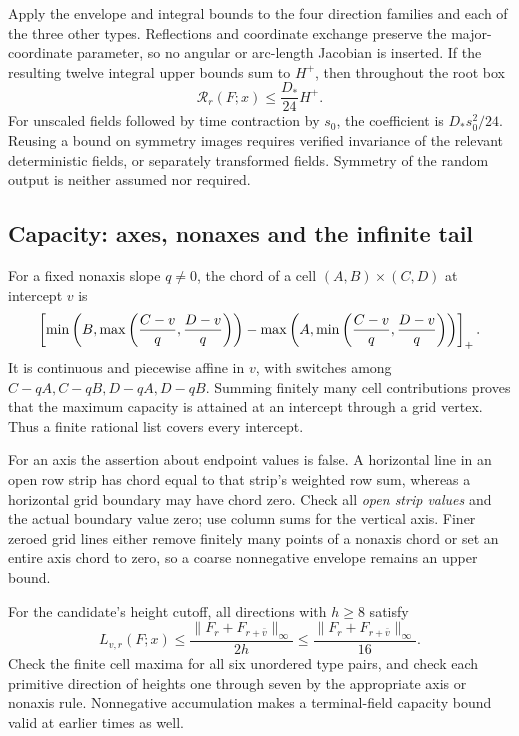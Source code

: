 Apply the envelope and integral bounds to the four direction families
and each of the three other types. Reflections and coordinate exchange
preserve the major-coordinate parameter, so no angular or arc-length
Jacobian is inserted. If the resulting twelve integral upper bounds
sum to \(H^+\), then throughout the root box
\begin{equation}\label{eq:certRisk}
 \mathcal R_r(F;x)\le\frac{D_*}{24}H^+.
\end{equation}
For unscaled fields followed by time contraction by \(s_0\), the
coefficient is \(D_*s_0^2/24\). Reusing a bound on symmetry images
requires verified invariance of the relevant deterministic fields,
or separately transformed fields. Symmetry of the random output is
neither assumed nor required.

\subsection{Capacity: axes, nonaxes and the infinite tail}
For a fixed nonaxis slope \(q\ne0\), the chord of a cell
\((A,B)\times(C,D)\) at intercept \(v\) is
\[
 \left[\min\left(B,\max\left(\frac{C-v}{q},\frac{D-v}{q}\right)\right)
 -\max\left(A,\min\left(\frac{C-v}{q},\frac{D-v}{q}\right)\right)\right]_+.
\]
It is continuous and piecewise affine in \(v\), with switches among
\(C-qA,C-qB,D-qA,D-qB\). Summing finitely many cell contributions
proves that the maximum capacity is attained at an intercept through
a grid vertex. Thus a finite rational list covers every intercept.

For an axis the assertion about endpoint values is false. A horizontal
line in an open row strip has chord equal to that strip's weighted
row sum, whereas a horizontal grid boundary may have chord zero.
Check all \emph{open strip values} and the actual boundary value zero;
use column sums for the vertical axis. Finer zeroed grid lines either
remove finitely many points of a nonaxis chord or set an entire axis
chord to zero, so a coarse nonnegative envelope remains an upper bound.

For the candidate's height cutoff, all directions with \(h\ge8\)
satisfy
\[
 L_{v,r}(F;x)\le\frac{\|F_r+F_{r+\bar v}\|_\infty}{2h}
 \le\frac{\|F_r+F_{r+\bar v}\|_\infty}{16}.
\]
Check the finite cell maxima for all six unordered type pairs, and
check each primitive direction of heights one through seven by the
appropriate axis or nonaxis rule. Nonnegative accumulation makes a
terminal-field capacity bound valid at earlier times as well.

